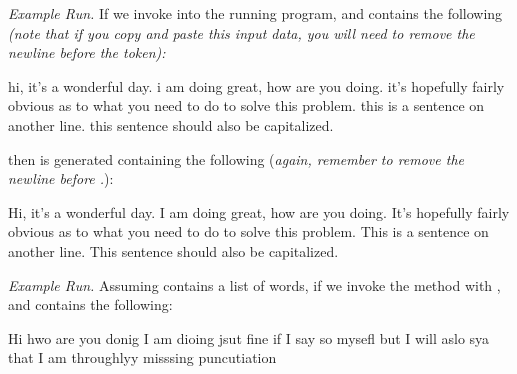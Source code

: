     \emph{Example Run.} If we invoke  into the running program, and  contains the following \emph{(note that if you copy and paste this input data, you will need to remove the newline before the  token):}

    \begin{verbnobox}[\small]
hi, it's a wonderful day. i am doing great, how are you doing. it's 
hopefully fairly obvious as to what you need to do to solve this problem.
this is a sentence on another line.
this sentence should also be capitalized.
    \end{verbnobox}

    then  is generated containing the following (\emph{again, remember to remove the newline before .}):

    \begin{verbnobox}[\small]
Hi, it's a wonderful day. I am doing great, how are you doing. It's 
hopefully fairly obvious as to what you need to do to solve this problem.
This is a sentence on another line.
This sentence should also be capitalized.
    \end{verbnobox}


    \emph{Example Run.} Assuming  contains a list of words, if we invoke the method with , and  contains the following:

    \begin{verbnobox}[\small]
Hi hwo are you donig I am dioing jsut fine if I say so mysefl but I 
will aslo sya that I am throughlyy misssing puncutiation
    \end{verbnobox}

